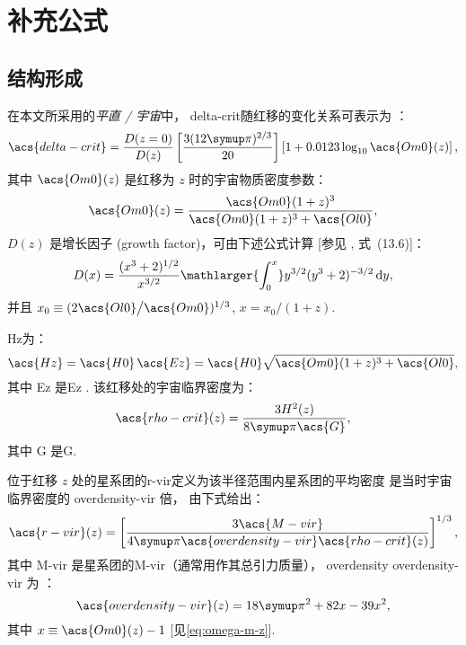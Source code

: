 
\chapter{补充公式}
\label{chap:formulas}

\section{结构形成}

在本文所采用的\emph{平直 \lcdm/ 宇宙}中，
\ac{delta-crit}随红移的变化关系可表示为 \cite{kitayama1996,randall2002}：
\begin{equation}
  \label{eq:delta-crit}
  \acs{delta-crit} = \frac{D(z=0)}{D(z)}
    \left[ \frac{3 (12\Cpi)^{2/3}}{20} \right]
    \left[1 + 0.0123 \log_{10} \acs{Om0}(z) \right] ,
\end{equation}
其中 $\acs{Om0}(z)$ 是红移为 $z$ 时的宇宙物质密度参数：
\begin{equation}
  \label{eq:omega-m-z}
  \acs{Om0}(z) = \frac{\acs{Om0} (1+z)^3}{\acs{Om0} (1+z)^3 + \acs{Ol0}} ,
\end{equation}
$D(z)$ 是增长因子 (growth factor)，可由下述公式计算
[参见 , 式~(13.6)]：
\begin{equation}
  \label{eq:growth-factor}
  D(x) = \frac{(x^3 + 2)^{1/2}}{x^{3/2}}
    \mathlarger{\int_0^x} y^{3/2} (y^3 + 2)^{-3/2} \,\D{y} ,
\end{equation}
并且 $x_0 \equiv (2 \acs{Ol0} \big/ \acs{Om0})^{1/3}$,
$x = x_0 \big/ (1+z)$.

\acl{Hz}为：
\begin{equation}
  \label{eq:hubble-z}
  \acs{Hz} = \acs{H0} \, \acs{Ez}
    = \acs{H0} \sqrt{\acs{Om0} (1+z)^3 + \acs{Ol0}} ,
\end{equation}
其中 \acs{Ez} 是\acl{Ez} \cite{hogg1999}.
该红移处的宇宙临界密度为：
\begin{equation}
  \label{eq:rho-crit}
  \acs{rho-crit}(z) = \frac{3 H^2(z)}{8 \Cpi \acs{G}} ,
\end{equation}
其中 \acs{G} 是\acl{G}.

位于红移 $z$ 处的星系团的\acf{r-vir}定义为该半径范围内星系团的平均密度
是当时宇宙临界密度的 \acs{overdensity-vir} 倍，
由下式给出：
\begin{equation}
  \label{eq:radius-virial}
  \acs{r-vir}(z) = \left[
    \frac{3 \acs{M-vir}}{4\Cpi \acs{overdensity-vir} \acs{rho-crit}(z)}
  \right]^{1/3},
\end{equation}
其中 \acs{M-vir} 是星系团的\acl{M-vir}（通常用作其总引力质量），
\acf{overdensity} \acs{overdensity-vir} 为 \cite{bryan1998}：
\begin{equation}
  \label{eq:delta-vir}
  \acs{overdensity-vir}(z) = 18\Cpi^2 + 82 x - 39 x^2,
\end{equation}
其中 $x \equiv \acs{Om0}(z) - 1$ [见\autoref{eq:omega-m-z}].


